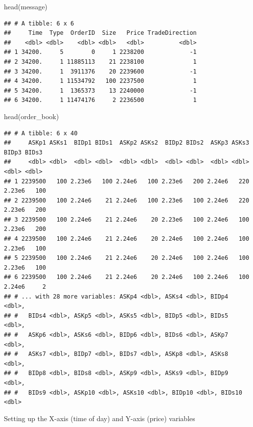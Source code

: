 \documentclass[
  oneside]{book}
\newenvironment{Shaded}{\begin{snugshade}}{\end{snugshade}}
\newcommand{\FunctionTok}[1]{\textcolor[rgb]{0.00,0.00,0.00}{#1}}
\newcommand{\NormalTok}[1]{#1}
\begin{document}
\begin{Shaded}
\begin{Highlighting}[]
\FunctionTok{head}\NormalTok{(message)}
\end{Highlighting}
\end{Shaded}

\begin{verbatim}
## # A tibble: 6 x 6
##     Time  Type  OrderID  Size   Price TradeDirection
##    <dbl> <dbl>    <dbl> <dbl>   <dbl>          <dbl>
## 1 34200.     5        0     1 2238200             -1
## 2 34200.     1 11885113    21 2238100              1
## 3 34200.     1  3911376    20 2239600             -1
## 4 34200.     1 11534792   100 2237500              1
## 5 34200.     1  1365373    13 2240000             -1
## 6 34200.     1 11474176     2 2236500              1
\end{verbatim}

\begin{Shaded}
\begin{Highlighting}[]
\FunctionTok{head}\NormalTok{(order\_book)}
\end{Highlighting}
\end{Shaded}

\begin{verbatim}
## # A tibble: 6 x 40
##     ASKp1 ASKs1  BIDp1 BIDs1  ASKp2 ASKs2  BIDp2 BIDs2  ASKp3 ASKs3  BIDp3 BIDs3
##     <dbl> <dbl>  <dbl> <dbl>  <dbl> <dbl>  <dbl> <dbl>  <dbl> <dbl>  <dbl> <dbl>
## 1 2239500   100 2.23e6   100 2.24e6   100 2.23e6   200 2.24e6   220 2.23e6   100
## 2 2239500   100 2.24e6    21 2.24e6   100 2.23e6   100 2.24e6   220 2.23e6   200
## 3 2239500   100 2.24e6    21 2.24e6    20 2.23e6   100 2.24e6   100 2.23e6   200
## 4 2239500   100 2.24e6    21 2.24e6    20 2.24e6   100 2.24e6   100 2.23e6   100
## 5 2239500   100 2.24e6    21 2.24e6    20 2.24e6   100 2.24e6   100 2.23e6   100
## 6 2239500   100 2.24e6    21 2.24e6    20 2.24e6   100 2.24e6   100 2.24e6     2
## # ... with 28 more variables: ASKp4 <dbl>, ASKs4 <dbl>, BIDp4 <dbl>,
## #   BIDs4 <dbl>, ASKp5 <dbl>, ASKs5 <dbl>, BIDp5 <dbl>, BIDs5 <dbl>,
## #   ASKp6 <dbl>, ASKs6 <dbl>, BIDp6 <dbl>, BIDs6 <dbl>, ASKp7 <dbl>,
## #   ASKs7 <dbl>, BIDp7 <dbl>, BIDs7 <dbl>, ASKp8 <dbl>, ASKs8 <dbl>,
## #   BIDp8 <dbl>, BIDs8 <dbl>, ASKp9 <dbl>, ASKs9 <dbl>, BIDp9 <dbl>,
## #   BIDs9 <dbl>, ASKp10 <dbl>, ASKs10 <dbl>, BIDp10 <dbl>, BIDs10 <dbl>
\end{verbatim}

Setting up the X-axis (time of day) and Y-axis (price) variables
\end{document}
